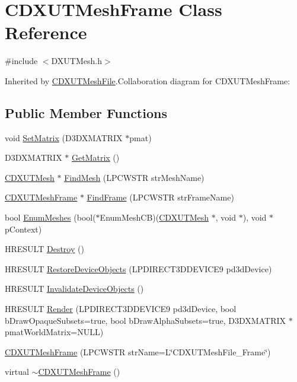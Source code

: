 \hypertarget{class_c_d_x_u_t_mesh_frame}{
\section{CDXUTMeshFrame Class Reference}
\label{class_c_d_x_u_t_mesh_frame}
}


{\ttfamily \#include $<$DXUTMesh.h$>$}

Inherited by \hyperlink{class_c_d_x_u_t_mesh_file}{CDXUTMeshFile}.Collaboration diagram for CDXUTMeshFrame:\subsection*{Public Member Functions}
\begin{DoxyCompactItemize}
\item 
void \hyperlink{class_c_d_x_u_t_mesh_frame_ad526c0fecb1d600a4c6597e4f62331b6}{SetMatrix} (D3DXMATRIX $\ast$pmat)
\item 
D3DXMATRIX $\ast$ \hyperlink{class_c_d_x_u_t_mesh_frame_a64ed732741542d6111824d2101dd6374}{GetMatrix} ()
\item 
\hyperlink{class_c_d_x_u_t_mesh}{CDXUTMesh} $\ast$ \hyperlink{class_c_d_x_u_t_mesh_frame_a65c4d08739e59490b4e3792a065fd149}{FindMesh} (LPCWSTR strMeshName)
\item 
\hyperlink{class_c_d_x_u_t_mesh_frame}{CDXUTMeshFrame} $\ast$ \hyperlink{class_c_d_x_u_t_mesh_frame_a6ac3d9657dc0cc9430f315b1fcc38b6f}{FindFrame} (LPCWSTR strFrameName)
\item 
bool \hyperlink{class_c_d_x_u_t_mesh_frame_a6998560440db07c6c62bb84938c65633}{EnumMeshes} (bool($\ast$EnumMeshCB)(\hyperlink{class_c_d_x_u_t_mesh}{CDXUTMesh} $\ast$, void $\ast$), void $\ast$pContext)
\item 
HRESULT \hyperlink{class_c_d_x_u_t_mesh_frame_a50ee36ed2f7029f26687ac3704e5b88e}{Destroy} ()
\item 
HRESULT \hyperlink{class_c_d_x_u_t_mesh_frame_adb3aba293444d69cf6b60f9b85ed1258}{RestoreDeviceObjects} (LPDIRECT3DDEVICE9 pd3dDevice)
\item 
HRESULT \hyperlink{class_c_d_x_u_t_mesh_frame_a1c1963f6cbf1808f4fe6be9a3c73e7a8}{InvalidateDeviceObjects} ()
\item 
HRESULT \hyperlink{class_c_d_x_u_t_mesh_frame_aed74e59459faea4616e2af4300a38131}{Render} (LPDIRECT3DDEVICE9 pd3dDevice, bool bDrawOpaqueSubsets=true, bool bDrawAlphaSubsets=true, D3DXMATRIX $\ast$pmatWorldMatrix=NULL)
\item 
\hyperlink{class_c_d_x_u_t_mesh_frame_a380a7768fe207481cfac4014f6eba973}{CDXUTMeshFrame} (LPCWSTR strName=L\char`\"{}CDXUTMeshFile\_\-Frame\char`\"{})
\item 
virtual \hyperlink{class_c_d_x_u_t_mesh_frame_ab6f087fc03f1af6f082a6fbd22c39a17}{$\sim$CDXUTMeshFrame} ()
\end{DoxyCompactItemize}
